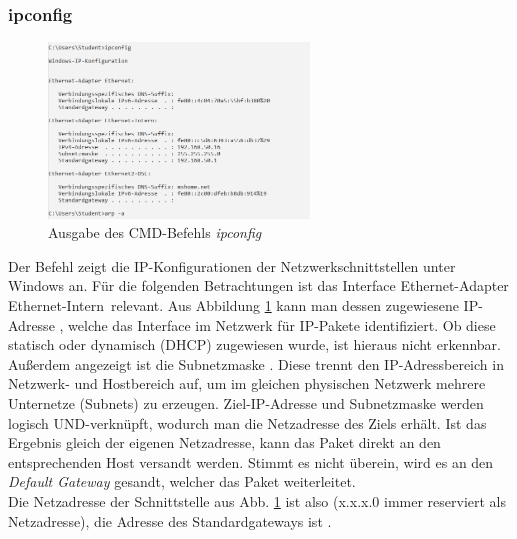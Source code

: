 \subsubsection{ipconfig}
\begin{figure}[H]
  \begin{center}
      \includegraphics[width=0.618\textwidth]{graphics/versuch/3_2/ipconfig}
      \caption{Ausgabe des CMD-Befehls \textit{ipconfig}}\label{abb_2}
  \end{center}
\end{figure}

Der Befehl  zeigt die IP-Konfigurationen der Netzwerkschnittstellen unter Windows an. Für die folgenden Betrachtungen ist das Interface \glqq Ethernet-Adapter Ethernet-Intern\grqq\ relevant. Aus Abbildung \ref{abb_2} kann man dessen zugewiesene IP-Adresse , welche das Interface im Netzwerk für IP-Pakete identifiziert. Ob diese statisch oder dynamisch (DHCP) zugewiesen wurde, ist hieraus nicht erkennbar. \\

Außerdem angezeigt ist die Subnetzmaske . Diese trennt den IP-Adressbereich in Netzwerk- und Hostbereich auf, um im gleichen physischen Netzwerk mehrere Unternetze (Subnets) zu erzeugen. Ziel-IP-Adresse und Subnetzmaske werden logisch UND-verknüpft, wodurch man die Netzadresse des Ziels erhält. Ist das Ergebnis gleich der eigenen Netzadresse, kann das Paket direkt an den entsprechenden Host versandt werden. Stimmt es nicht überein, wird es an den \emph{Default Gateway} gesandt, welcher das Paket weiterleitet.\\

Die Netzadresse der Schnittstelle aus Abb. \ref{abb_2} ist also  (x.x.x.0 immer reserviert als Netzadresse), die Adresse des Standardgateways ist .

